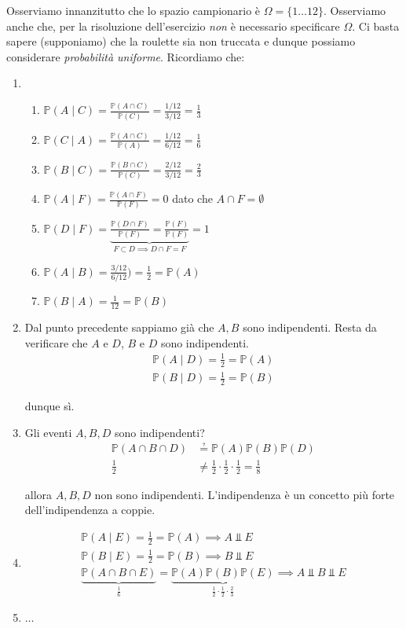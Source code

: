 Osserviamo innanzitutto che lo spazio campionario è $\Omega =\{1\dots 12\}$. Osserviamo anche che, per la risoluzione dell'esercizio \textit{non} è necessario specificare $\Omega $. Ci basta sapere (supponiamo) che la roulette sia non truccata e dunque possiamo considerare \textit{probabilità uniforme}. Ricordiamo che:
\begin{enumerate}
\item 
\begin{enumerate}
\item $\mathbb{P}( A\mid C) =\frac{\mathbb{P}( A\cap C)}{\mathbb{P}( C)} =\frac{1/12}{3/12} =\frac{1}{3}$
\item $\mathbb{P}( C\mid A) =\frac{\mathbb{P}( A\cap C)}{\mathbb{P}( A)} =\frac{1/12}{6/12} =\frac{1}{6}$
\item $\mathbb{P}( B\mid C) =\frac{\mathbb{P}( B\cap C)}{\mathbb{P}( C)} =\frac{2/12}{3/12} =\frac{2}{3}$
\item $\mathbb{P}( A\mid F) =\frac{\mathbb{P}( A\cap F)}{\mathbb{P}( F)} =0$ dato che $A\cap F=\emptyset $
\item $\mathbb{P}( D\mid F) =\underbrace{\frac{\mathbb{P}( D\cap F)}{\mathbb{P}( F)} =\frac{\mathbb{P}( F)}{\mathbb{P}( F)}}_{F\subset D\implies D\cap F=F} =1$
\item $\mathbb{P}( A\mid B) =\frac{3/12}{6/12}) =\frac{1}{2} =\mathbb{P}( A)$
\item $\mathbb{P}( B\mid A) =\frac{1}{12} =\mathbb{P}( B)$
\end{enumerate}
\item Dal punto precedente sappiamo già che $A,B$ sono indipendenti. Resta da verificare che $A$ e $D$, $B$ e $D$ sono indipendenti.\begin{gather*}
\mathbb{P}( A\mid D) =\frac{1}{2} =\mathbb{P}( A)\\
\mathbb{P}( B\mid D) =\frac{1}{2} =\mathbb{P}( B)
\end{gather*}

dunque sì.
\item Gli eventi $A,B,D$ sono indipendenti?\begin{equation*}
\begin{aligned}
\mathbb{P}( A\cap B\cap D) & \questeq \mathbb{P}( A)\mathbb{P}( B)\mathbb{P}( D)\\
\frac{1}{2} & \neq \frac{1}{2} \cdotp \frac{1}{2} \cdotp \frac{1}{2} =\frac{1}{8}
\end{aligned}
\end{equation*}

allora $A,B,D$ non sono indipendenti. L'indipendenza è un concetto più forte dell'indipendenza a coppie.
\item \begin{gather*}
\mathbb{P}( A\mid E) =\frac{1}{2} =\mathbb{P}( A) \implies A\Bot E\\
\mathbb{P}( B\mid E) =\frac{1}{2} =\mathbb{P}( B) \implies B\Bot E\\
\underbrace{\mathbb{P}( A\cap B\cap E)}_{\frac{1}{6}} =\underbrace{\mathbb{P}( A)\mathbb{P}( B)\mathbb{P}( E)}_{\frac{1}{2} \cdotp \frac{1}{2} \cdotp \frac{2}{3}} \implies A\Bot B\Bot E
\end{gather*}
\item $\dots $
\end{enumerate}
\Soluzione

